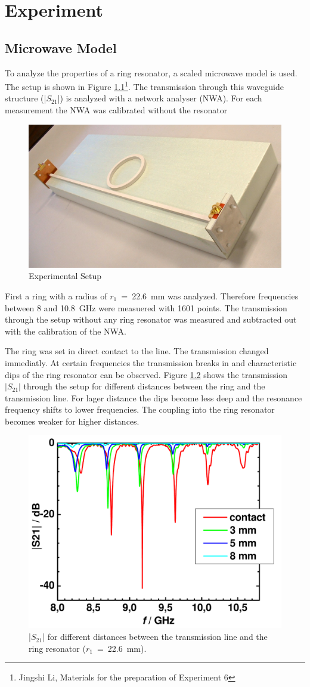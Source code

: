 \chapter{Experiment}
\label{ch:part1}


\section{Microwave Model}

To analyze the properties of a ring resonator, a scaled microwave model is used. The setup is shown in Figure \ref{fig:setup}\footnote[1]{Jingshi Li, Materials for the preparation of Experiment 6}. The transmission through this waveguide structure (|$S_{21}$|) is analyzed with a network analyser (NWA). For each measurement the NWA was calibrated without the resonator 
\begin{figure}%
\centering
\includegraphics[width=.5\columnwidth]{Grafiken/foto_resonator.jpg}%
\caption{Experimental Setup}%
\label{fig:setup}%
\end{figure}

First a ring with a radius of $r_1$~=~22.6~mm was analyzed. Therefore frequencies between 8 and 10.8~GHz were measuered with 1601 points. The transmission through the setup without any ring resonator was measured and subtracted out with the calibration of the NWA.

The ring was set in direct contact to the line. The transmission changed immediatly. At certain frequencies the transmission breaks in and characteristic dips of the ring resonator can be observed. Figure \ref{fig:01_s21} shows the transmission $|S_{21}|$ through the setup for different distances between the ring and the transmission line.
For lager distance the dips become less deep and the resonance frequency shifts to lower frequencies. The coupling into the ring resonator becomes weaker for higher distances.
 
\begin{figure}%
\centering
\includegraphics[width=.6\columnwidth]{Grafiken/01_s21.pdf}%
\caption{|$S_{21}$| for different distances between the transmission line and the ring resonator ($r_1$~=~22.6~mm).}%
\label{fig:01_s21}%
\end{figure}

